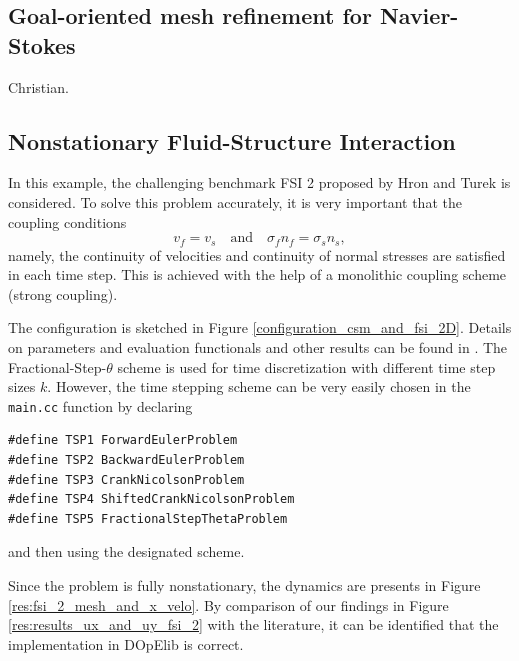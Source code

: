 \documentclass[prodmode,acmtoms]{acmsmall}
\numberwithin{equation}{section}
\begin{document}
\subsection{Goal-oriented mesh refinement for Navier-Stokes}
Christian.


\subsection{Nonstationary Fluid-Structure Interaction}
In this example, the challenging benchmark FSI 2
proposed by Hron and Turek \cite{HrTu06b} is considered.
To solve this problem accurately, it is very important that 
the coupling conditions
\[
v_f = v_s \quad \text{and} \quad \sigma_f n_f = \sigma_s n_s, 
\]
namely, the continuity of velocities and continuity of normal stresses
are satisfied in each time step. This is achieved with the help of 
a monolithic coupling scheme (strong coupling).

The configuration is 
sketched in Figure \ref{configuration_csm_and_fsi_2D}. Details 
on parameters and evaluation functionals and other results 
can be found in \cite{HrTu06b, BuSc06, TuHrMaRaWoAc10, DeHaeAnnBrVie10, Wi11}. 
The Fractional-Step-$\theta$ scheme is used for time discretization with
different time step sizes $k$. However, the time stepping scheme can be 
very easily chosen in the \texttt{main.cc} function by declaring
\begin{lstlisting}
#define TSP1 ForwardEulerProblem
#define TSP2 BackwardEulerProblem
#define TSP3 CrankNicolsonProblem
#define TSP4 ShiftedCrankNicolsonProblem
#define TSP5 FractionalStepThetaProblem
\end{lstlisting}
and then using the designated scheme.





Since the problem is fully nonstationary, the 
dynamics are presents in Figure \ref{res:fsi_2_mesh_and_x_velo}. 
By comparison of our findings in Figure \ref{res:results_ux_and_uy_fsi_2}
with the literature, it can be identified that 
the implementation in DOpElib is correct.
\end{document}
